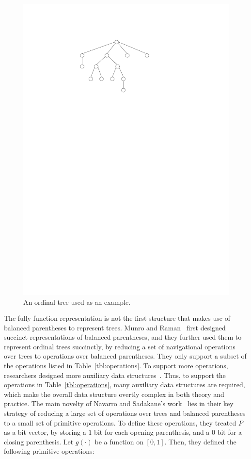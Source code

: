 \begin{figure}
\centering
\includegraphics[scale=0.5]{images/bp.pdf}
\caption{An ordinal tree used as an example.}
\label{figure:bp}
\end{figure}

The fully function representation is not the first structure that makes use of balanced parentheses to represent trees. 
Munro and Raman~\cite{mr1997} first designed succinct representations of balanced parentheses, and they further used them to represent ordinal trees succinctly, by reducing a set of navigational operations over trees to operations over balanced parentheses. 
They only support a subset of the operations listed in Table~\ref{tbl:operations}. 
To support more operations, researchers designed more auxiliary data structures~\cite{ly2008}. 
Thus, to support the operations in Table~\ref{tbl:operations}, many auxiliary data structures are required, which make the overall data structure overtly complex in both theory and practice. 
The main novelty of Navarro and Sadakane's work~\cite{Navarro:2014:FFS:2620785.2601073} lies in their key strategy of reducing a large set of operations over trees and balanced parentheses to a small set of primitive operations. 
To define these operations, they treated $P$ as a bit vector, by storing a $1$ bit for each opening parenthesis, and a $0$ bit for a closing parenthesis. 
Let $g(\cdot)$ be a function on $[0,1]$. Then, they defined the following primitive operations:

